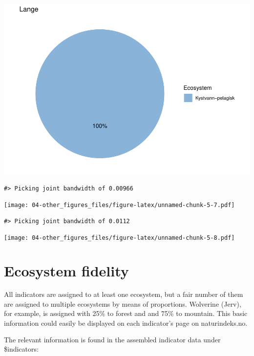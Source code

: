 \documentclass[
]{book}
\begin{document}
\includegraphics{04-other_figures_files/figure-latex/unnamed-chunk-5-6.pdf}

\begin{verbatim}
#> Picking joint bandwidth of 0.00966
\end{verbatim}

\texttt{[image: 04-other\_figures\_files/figure-latex/unnamed-chunk-5-7.pdf]}

\begin{verbatim}
#> Picking joint bandwidth of 0.0112
\end{verbatim}

\texttt{[image: 04-other\_figures\_files/figure-latex/unnamed-chunk-5-8.pdf]}

\hypertarget{ecosystem-fidelity}{%
\section{Ecosystem fidelity}\label{ecosystem-fidelity}}

All indicators are assigned to at least one ecosystem, but a fair number of them are assigned to multiple ecosystems by means of proportions. Wolverine (Jerv), for example, is assigned with 25\% to forest and and 75\% to mountain. This basic information could easily be displayed on each indicator's page on naturindeks.no.

The relevant information is found in the assembled indicator data under \$indicators:
\end{document}
